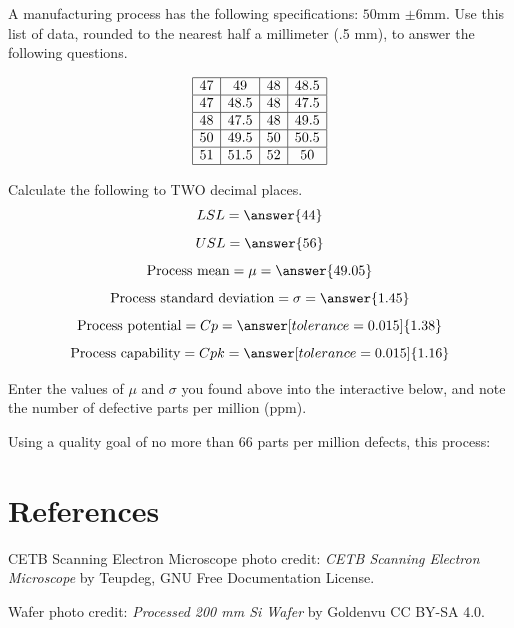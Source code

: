 \documentclass{ximera}
\begin{document}
\begin{problem}\label{prob:prob2a}
A manufacturing process has the following specifications: $50$mm $\pm6$mm.
Use this list of data, rounded to the nearest half a millimeter (.5 mm), to answer the following questions. 

$$\begin{array}{|c|c|c|c|} 
 \hline 
 47 & 49 & 48 & 48.5\\ \hline 
 47 & 48.5 & 48 & 47.5\\ \hline 
 48 & 47.5 & 48 & 49.5\\ \hline 
 50 & 49.5 & 50 & 50.5\\ \hline 
 51 & 51.5 & 52 & 50\\ \hline 
 \end{array}$$

Calculate the following to TWO decimal places.
$$LSL=\answer{44}$$
$$USL=\answer{56}$$
$$\text{Process mean}=\mu=\answer{49.05}$$
$$\text{Process standard deviation}=\sigma=\answer{1.45}$$
$$\text{Process potential}=Cp=\answer[tolerance=0.015]{1.38}$$
$$\text{Process capability}=Cpk=\answer[tolerance=0.015]{1.16}$$

Enter the values of $\mu$ and $\sigma$ you found above into the interactive below, and note the number of defective parts per million (ppm).

\begin{onlineOnly}
\begin{center} 
\end{center}
\end{onlineOnly}

Using a quality goal of no more than 66 parts per million defects, this process:

\begin{multipleChoice}
\end{multipleChoice}


\end{problem}

\section*{References}

CETB Scanning Electron Microscope photo credit: \textit{CETB Scanning Electron Microscope} by Teupdeg, GNU Free Documentation License.

Wafer photo credit: \textit{Processed 200 mm Si Wafer} by Goldenvu CC BY-SA 4.0.
\end{document}
